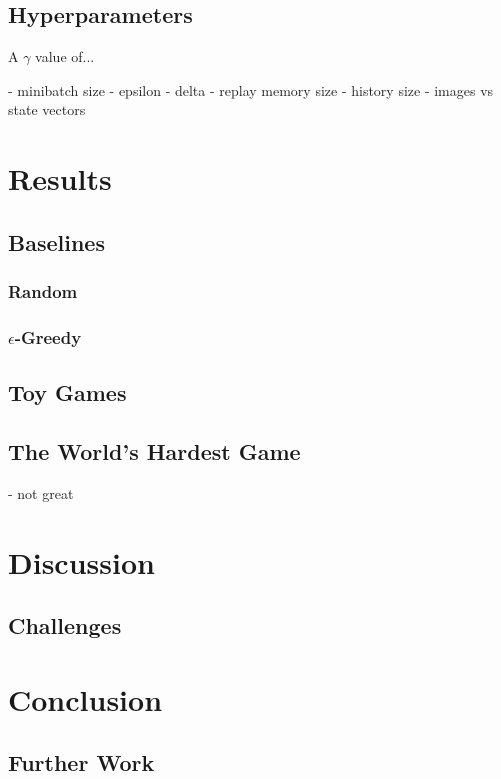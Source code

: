 \documentclass[12pt]{article}
\begin{document}
\subsection{Hyperparameters}

A $\gamma$ value of...

- minibatch size
- epsilon
- delta
- replay memory size
- history size
- images vs state vectors

\section{Results}

\subsection{Baselines}

\subsubsection{Random}

\subsubsection{$\epsilon$-Greedy}

\subsection{Toy Games}

\subsection{The World's Hardest Game}

- not great

\section{Discussion}

\subsection{Challenges}

\section{Conclusion}

\subsection{Further Work}

\pagebreak
\printbibliography
\end{document}
